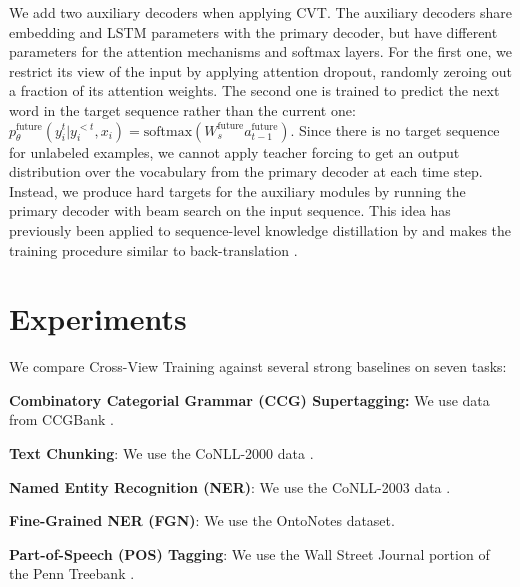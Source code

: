 \documentclass[11pt,a4paper]{article}
\begin{document}
We add two auxiliary decoders when applying CVT. The auxiliary decoders share embedding and LSTM parameters with the primary decoder, but have different parameters for the attention mechanisms and softmax layers. For the first one, we restrict its view of the input by applying attention dropout, randomly zeroing out a fraction of its attention weights. The second one is trained to predict the next word in the target sequence rather than the current one:
$p_\theta^{\text{future}}(y^t_i|y^{<t}_i, x_i) = \text{softmax}(W_s^{\text{future}} a^{\text{future}}_{t - 1})$. 
Since there is no target sequence for unlabeled examples, we cannot apply teacher forcing to get an output distribution over the vocabulary from the primary decoder at each time step. Instead, we produce hard targets for the auxiliary modules by running the primary decoder with beam search on the input sequence. This idea has previously been applied to sequence-level knowledge distillation by \citet{Kim2016SequenceLevelKD} and makes the training procedure similar to back-translation \citep{Sennrich2016ImprovingNM}.




\section{Experiments}
We compare Cross-View Training against several strong baselines on seven tasks:

\vspace{1.5mm}\noindent \textbf{Combinatory Categorial Grammar (CCG) Supertagging:} 
We use data from CCGBank \citep{hockenmaier2007ccgbank}.

\vspace{1.5mm}\noindent \textbf{Text Chunking}: 
We use the CoNLL-2000 data \citep{tjong2000introduction}.

\vspace{1.5mm}\noindent \textbf{Named Entity Recognition (NER)}: 
We use the CoNLL-2003 data \citep{tjong2003introduction}.

\vspace{1.5mm}\noindent \textbf{Fine-Grained NER (FGN)}: 
We use the OntoNotes \citep{hovy2006ontonotes} dataset.

\vspace{1.5mm}\noindent \textbf{Part-of-Speech (POS) Tagging}: 
We use the Wall Street Journal portion of the Penn Treebank \citep{marcus1993building}.
\end{document}

